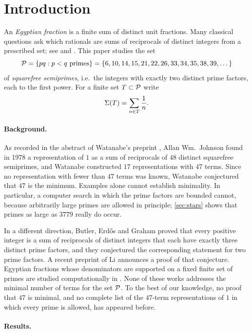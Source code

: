 \documentclass[11pt]{article}
\begin{document}
\section{Introduction}\label{sec:intro}

An \emph{Egyptian fraction} is a finite sum of distinct unit fractions. Many classical questions ask which rationals are sums of reciprocals of distinct integers from a prescribed set; see \cite{Graham1964,ErdosGraham1980,Graham2013} and \cite[Section~D11]{Guy2004}.
This paper studies the set
\[
\mathcal{P}=\{pq : p<q \text{ primes}\}=\{6,10,14,15,21,22,26,33,34,35,38,39,\dots\}
\]
of \emph{squarefree semiprimes}, i.e.\ the integers with exactly two distinct prime factors, each to the first power.
For a finite set $T\subset\mathcal{P}$ write
\[
\Sigma(T)=\sum_{n\in T}\frac1n .
\]

\paragraph{Background.}
As recorded in the abstract of Watanabe's preprint \cite{Watanabe2020}, Allan Wm.~Johnson found in 1978 a representation of $1$ as a sum of reciprocals of $48$ distinct squarefree semiprimes, and Watanabe constructed $17$ representations with $47$ terms.
Since no representation with fewer than $47$ terms was known, Watanabe conjectured that $47$ is the minimum.
Examples alone cannot establish minimality. In particular, a computer search in which the prime factors are bounded cannot, because arbitrarily large primes are allowed in principle; \cref{sec:stars} shows that primes as large as $3779$ really do occur.

In a different direction, Butler, Erd\H{o}s and Graham \cite{ButlerErdosGraham2015} proved that every positive integer is a sum of reciprocals of distinct integers that each have exactly three distinct prime factors, and they conjectured the corresponding statement for two prime factors. A recent preprint of Li \cite{Li2026} announces a proof of that conjecture.
Egyptian fractions whose denominators are supported on a fixed finite set of primes are studied computationally in \cite{Czenky2025}.
None of these works addresses the minimal number of terms for the set $\mathcal{P}$.
To the best of our knowledge, no proof that $47$ is minimal, and no complete list of the $47$-term representations of $1$ in which every prime is allowed, has appeared before.

\paragraph{Results.}
\end{document}
